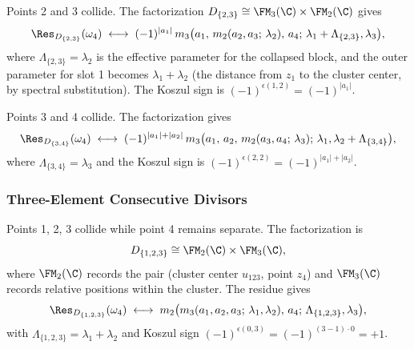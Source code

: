 \begin{computation}[$D_{\{2,3\}}$ in $\FM_4(\C)$]
Points 2 and 3 collide. The factorization $D_{\{2,3\}} \cong \FM_3(\C) \times \FM_2(\C)$ gives
\[
\Res_{D_{\{2,3\}}}(\omega_4) \;\longleftrightarrow\; (-1)^{|a_1|}\, m_3\bigl(a_1,\, m_2(a_2, a_3;\, \lambda_2),\, a_4;\, \lambda_1 + \Lambda_{\{2,3\}}, \lambda_3\bigr),
\]
where $\Lambda_{\{2,3\}} = \lambda_2$ is the effective parameter for the collapsed block, and the outer parameter for slot 1 becomes $\lambda_1 + \lambda_2$ (the distance from $z_1$ to the cluster center, by spectral substitution). The Koszul sign is $(-1)^{\epsilon(1,2)} = (-1)^{|a_1|}$.
\end{computation}

\begin{computation}[$D_{\{3,4\}}$ in $\FM_4(\C)$]
Points 3 and 4 collide. The factorization gives
\[
\Res_{D_{\{3,4\}}}(\omega_4) \;\longleftrightarrow\; (-1)^{|a_1|+|a_2|}\, m_3\bigl(a_1,\, a_2,\, m_2(a_3, a_4;\, \lambda_3);\, \lambda_1, \lambda_2 + \Lambda_{\{3,4\}}\bigr),
\]
where $\Lambda_{\{3,4\}} = \lambda_3$ and the Koszul sign is $(-1)^{\epsilon(2,2)} = (-1)^{|a_1|+|a_2|}$.
\end{computation}

\subsubsection{Three-Element Consecutive Divisors}

\begin{computation}[$D_{\{1,2,3\}}$ in $\FM_4(\C)$]
Points 1, 2, 3 collide while point 4 remains separate. The factorization is
\[
D_{\{1,2,3\}} \cong \FM_2(\C) \times \FM_3(\C),
\]
where $\FM_2(\C)$ records the pair (cluster center $u_{123}$, point $z_4$) and $\FM_3(\C)$ records relative positions within the cluster. The residue gives
\[
\Res_{D_{\{1,2,3\}}}(\omega_4) \;\longleftrightarrow\; m_2\bigl(m_3(a_1, a_2, a_3;\, \lambda_1, \lambda_2),\, a_4;\, \Lambda_{\{1,2,3\}}, \lambda_3\bigr),
\]
with $\Lambda_{\{1,2,3\}} = \lambda_1 + \lambda_2$ and Koszul sign $(-1)^{\epsilon(0,3)} = (-1)^{(3-1)\cdot 0} = +1$.
\end{computation}

